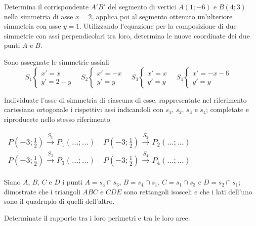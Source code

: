 \begin{esercizio}
  \label{ese:8.99} %
  Determina il corrispondente \(A'B'\) del segmento di vertici \(A(1;-6)\) 
  e \(B(4;3)\) nella simmetria di asse \(x = 2\), applica poi al segmento 
  ottenuto un'ulteriore simmetria con asse \(y = 1\). Utilizzando 
  l'equazione per la composizione di due simmetrie con assi 
  perpendicolari tra loro, determina le nuove coordinate dei due punti 
  \(A\) e \(B\).
\end{esercizio}

\begin{esercizio}
  \label{ese:8.101} %
  Sono assegnate le simmetrie assiali
  \[S_1 \begin{cases}x'=x\\y'=2-y\end{cases}\quad  S_2 
  \begin{cases}x'=-x\\y'=y\end{cases}\quad S_3 
  \begin{cases}x'=x\\y'=y\end{cases}\quad S_4 
  \begin{cases}x'=-x-6\\y'=y\end{cases}\]
  \begin{enumeratea}
    \item Individuate l'asse di simmetria di ciascuna di esse, 
    rappresentate nel riferimento cartesiano ortogonale i rispettivi assi 
    indicandoli con \(s_1\), \(s_2\), \(s_3\) e \(s_4\); completate e riproducete 
    nello stesso riferimento
    
    \begin{center}
      \begin{tabular}{cc}
        \(P\left(-3;\frac{1}{2}\right)\overset{S_1}\longrightarrow 
        P_1(\ldots{};\ldots{})\) & 
        \(P\left(-3;\frac{1}{2}\right)\overset{S_2}\longrightarrow 
        P_2(\ldots{};\ldots{})\)\\
        \(P\left(-3;\frac{1}{2}\right)\overset{S_3}\longrightarrow 
        P_3(\ldots{};\ldots{})\) & 
        \(P\left(-3;\frac{1}{2}\right)\overset{S_4}\longrightarrow 
        P_4(\ldots{};\ldots{})\)\\
      \end{tabular}
    \end{center}
    
    \item Siano \(A\), \(B\), \(C\) e \(D\) i punti \(A=s_4\cap s_3\), \(B=s_4\cap 
    s_1\), \(C=s_1\cap s_3\) e \(D=s_2\cap s_1\); dimostrate che i triangoli 
    \(ABC\) e \(CDE\) sono rettangoli isosceli e che i lati dell'uno sono il 
    quadruplo di quelli dell'altro.
    \item Determinate il rapporto tra i loro perimetri e tra le loro aree.
  \end{enumeratea}
\end{esercizio}

